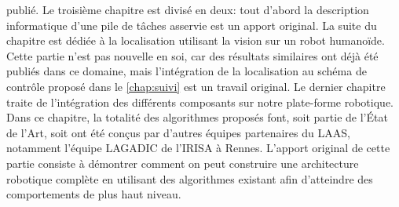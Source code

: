 publié. Le troisième chapitre est divisé en deux: tout d'abord la
description informatique d'une pile de tâches asservie est un apport
original. La suite du chapitre est dédiée à la localisation utilisant
la vision sur un robot humanoïde. Cette partie n'est pas nouvelle en
soi, car des résultats similaires ont déjà été publiés dans ce
domaine, mais l'intégration de la localisation au schéma de contrôle
proposé dans le \autoref{chap:suivi} est un travail original. Le
dernier chapitre traite de l'intégration des différents composants sur
notre plate-forme robotique. Dans ce chapitre, la totalité des
algorithmes proposés font, soit partie de l'État de l'Art, soit ont été
conçus par d'autres équipes partenaires du LAAS, notamment l'équipe
\mbox{LAGADIC} de l'IRISA à Rennes. L'apport original de cette partie
consiste à démontrer comment on peut construire une architecture
robotique complète en utilisant des algorithmes existant afin
d'atteindre des comportements de plus haut niveau.
